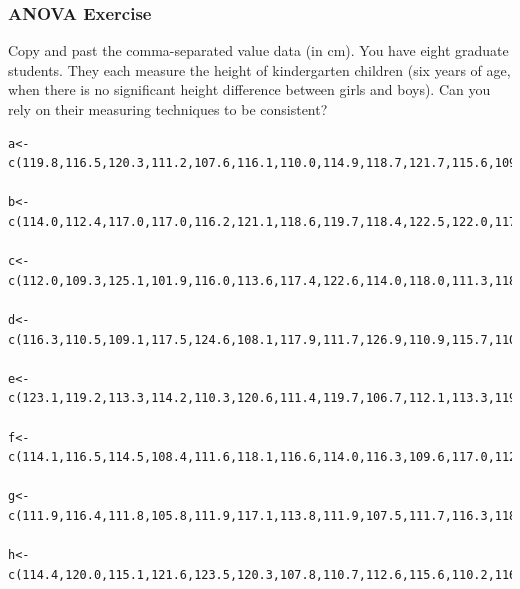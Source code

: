 \documentclass[xcolor=dvipsnames]{beamer}
\begin{document}
\begin{frame}[fragile]
  \frametitle{ANOVA Exercise}
  {\ubung} Copy and past the comma-separated value data (in cm). You
  have eight graduate students. They each measure the height of
  kindergarten children (six years of age, when there is no
  significant height difference between girls and boys). Can you rely
  on their measuring techniques to be consistent?
\begin{verbatim}
a<-c(119.8,116.5,120.3,111.2,107.6,116.1,110.0,114.9,118.7,121.7,115.6,109.4,107.8,113.9,114.7,118.9,124.4,109.1,111.9,117.6,111.1,121.8,116.7,117.9,117.9)

b<-c(114.0,112.4,117.0,117.0,116.2,121.1,118.6,119.7,118.4,122.5,122.0,117.8,124.2,112.8,116.4,112.2,113.7,114.7,116.8,122.4,111.7,115.9,114.4,109.6,123.2,110.5,109.6,126.4)

c<-c(112.0,109.3,125.1,101.9,116.0,113.6,117.4,122.6,114.0,118.0,111.3,118.4,117.0,121.3,118.6,119.8,120.0,121.5,122.3,120.7,123.2,106.3,121.8,123.2)

d<-c(116.3,110.5,109.1,117.5,124.6,108.1,117.9,111.7,126.9,110.9,115.7,110.8,112.1,114.7,123.1,119.3,109.4,112.3,112.3,120.2,119.3,104.7,113.6,112.4,115.2,112.9,121.8,128.8,115.7,114.6)

e<-c(123.1,119.2,113.3,114.2,110.3,120.6,111.4,119.7,106.7,112.1,113.3,119.3,119.5,125.6,120.3,110.9,112.3,118.1,115.7,112.6,113.3,115.4,121.8,116.7,109.1,117.8,113.0,107.4,117.3)

f<-c(114.1,116.5,114.5,108.4,111.6,118.1,116.6,114.0,116.3,109.6,117.0,112.0,116.7,121.6,119.8,114.3,118.5,121.4,110.9,110.6,118.5,109.8,123.5,119.9,114.1,115.2,123.8,113.6,110.3,111.7,106.6)

g<-c(111.9,116.4,111.8,105.8,111.9,117.1,113.8,111.9,107.5,111.7,116.3,118.4,116.0,117.3,126.3,114.8,113.1,120.6,105.6,119.6,113.6,116.9,120.7,121.5,117.1,117.4)

h<-c(114.4,120.0,115.1,121.6,123.5,120.3,107.8,110.7,112.6,115.6,110.2,116.3,121.1,112.4,123.6,116.1,116.2,117.3,116.3,113.1,116.0,111.4,111.7,117.1,116.2,113.9)
\end{verbatim}
\end{frame}
\end{document}
